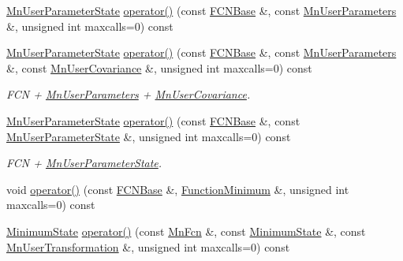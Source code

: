 \begin{DoxyCompactItemize}
\mbox{\hyperlink{classROOT_1_1Minuit2_1_1MnUserParameterState}{Mn\+User\+Parameter\+State}} \mbox{\hyperlink{classROOT_1_1Minuit2_1_1MnHesse_ab7a2674f254e7f6056885d7d792ea671}{operator()}} (const \mbox{\hyperlink{classROOT_1_1Minuit2_1_1FCNBase}{F\+C\+N\+Base}} \&, const \mbox{\hyperlink{classROOT_1_1Minuit2_1_1MnUserParameters}{Mn\+User\+Parameters}} \&, unsigned int maxcalls=0) const
\item 
\mbox{\hyperlink{classROOT_1_1Minuit2_1_1MnUserParameterState}{Mn\+User\+Parameter\+State}} \mbox{\hyperlink{classROOT_1_1Minuit2_1_1MnHesse_aeba6a2c85b9bda7785d418a6e2605722}{operator()}} (const \mbox{\hyperlink{classROOT_1_1Minuit2_1_1FCNBase}{F\+C\+N\+Base}} \&, const \mbox{\hyperlink{classROOT_1_1Minuit2_1_1MnUserParameters}{Mn\+User\+Parameters}} \&, const \mbox{\hyperlink{classROOT_1_1Minuit2_1_1MnUserCovariance}{Mn\+User\+Covariance}} \&, unsigned int maxcalls=0) const
\begin{DoxyCompactList}\small\item\em F\+CN + \mbox{\hyperlink{classROOT_1_1Minuit2_1_1MnUserParameters}{Mn\+User\+Parameters}} + \mbox{\hyperlink{classROOT_1_1Minuit2_1_1MnUserCovariance}{Mn\+User\+Covariance}}. \end{DoxyCompactList}\item 
\mbox{\hyperlink{classROOT_1_1Minuit2_1_1MnUserParameterState}{Mn\+User\+Parameter\+State}} \mbox{\hyperlink{classROOT_1_1Minuit2_1_1MnHesse_a4ebea568262a19a0cfec1473ce7a5f0f}{operator()}} (const \mbox{\hyperlink{classROOT_1_1Minuit2_1_1FCNBase}{F\+C\+N\+Base}} \&, const \mbox{\hyperlink{classROOT_1_1Minuit2_1_1MnUserParameterState}{Mn\+User\+Parameter\+State}} \&, unsigned int maxcalls=0) const
\begin{DoxyCompactList}\small\item\em F\+CN + \mbox{\hyperlink{classROOT_1_1Minuit2_1_1MnUserParameterState}{Mn\+User\+Parameter\+State}}. \end{DoxyCompactList}\item 
void \mbox{\hyperlink{classROOT_1_1Minuit2_1_1MnHesse_a3b6ba68a41260029bc6bde433170e600}{operator()}} (const \mbox{\hyperlink{classROOT_1_1Minuit2_1_1FCNBase}{F\+C\+N\+Base}} \&, \mbox{\hyperlink{classROOT_1_1Minuit2_1_1FunctionMinimum}{Function\+Minimum}} \&, unsigned int maxcalls=0) const
\item 
\mbox{\hyperlink{classROOT_1_1Minuit2_1_1MinimumState}{Minimum\+State}} \mbox{\hyperlink{classROOT_1_1Minuit2_1_1MnHesse_a4130de0190695811a4606f8ab229482d}{operator()}} (const \mbox{\hyperlink{classROOT_1_1Minuit2_1_1MnFcn}{Mn\+Fcn}} \&, const \mbox{\hyperlink{classROOT_1_1Minuit2_1_1MinimumState}{Minimum\+State}} \&, const \mbox{\hyperlink{classROOT_1_1Minuit2_1_1MnUserTransformation}{Mn\+User\+Transformation}} \&, unsigned int maxcalls=0) const

\end{DoxyCompactItemize}
